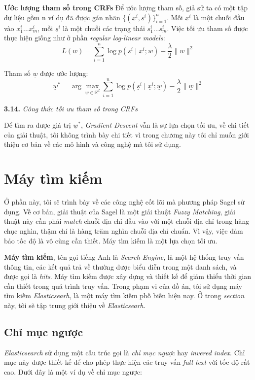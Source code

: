 \vspace{0.5cm}
\textbf{Ước lượng tham số trong CRFs} Để ước lượng tham số, giả sử ta có một tập dữ liệu gồm n ví dụ đã được gán nhãn $\{(\underline{x}^i,\underline{s}^i)\}_{i=1}^n$. Mỗi $\underline{x}^i$ là một chuỗi đầu vào $x_1^i ... x_m^i$, mỗi $\underline{s}^i$ là một chuỗi các trạng thái $s_1^i ... s_m^i $. Việc tối ưu tham số được thực hiện giống như ở phần \textit{regular log-linear models}:
$$L(\underline{w}) = \sum_{i=1}^n \log p(\underline{s}^i \mid \underline{x}^i;w) - \frac{\lambda}{2}\|\underline{w}\|^2$$

Tham số $\underline{w}$ được ước lượng:
$$\underline{w}^* = \arg \max_{\underline{w} \in \mathbb{R}^d} \sum_{i=1}^n \log p(\underline{s}^i \mid \underline{x}^i; \underline{w}) - \frac{\lambda}{2}\|\underline{w}\|^2 $$
\begin{center}

\vspace{0.1cm}
\textbf{3.14.} \textit{Công thức tối ưu tham số trong CRFs}    
\end{center}

Để tìm ra được giá trị $\underline{w}^*$, \textit{Gradient Descent} vẫn là sự lựa chọn tối ưu, về chi tiết của giải thuật, tôi không trình bày chi tiết vì trong chương này tôi chỉ muốn giới thiệu cơ bản về các mô hình và công nghệ mà tôi sử dụng.

\section{Máy tìm kiếm}
Ở phần này, tôi sẽ trình bày về các công nghệ cốt lõi mà phương pháp Sagel sử dụng. Về cơ bản, giải thuật của Sagel là một giải thuật \textit{Fuzzy Matching}, giải thuật này cần phải \textit{match} chuỗi địa chỉ đầu vào với một chuỗi địa chỉ trong hàng chục nghìn, thậm chí là hàng trăm nghìn chuỗi địa chỉ chuẩn. Vì vậy, việc đảm bảo tốc độ là vô cùng cần thiết. Máy tìm kiếm là một lựa chọn tối ưu.

\vspace{0.5cm}
\textbf{Máy tìm kiếm}, tên gọi tiếng Anh là \textit{Search Engine}, là một hệ thống truy vấn thông tin, các kết quả trả về thường được biểu diễn trong một danh sách, và được gọi là \textit{hits}. Máy tìm kiếm được xây dựng và thiết kế để giảm thiểu thời gian cần thiết trong quá trình truy vấn. Trong phạm vi của đồ án, tôi sử dụng máy tìm kiếm \textit{Elasticsearh}, là một máy tìm kiếm phố biến hiện nay. Ở trong \textit{section} này, tôi sẽ tập trung giới thiệu về \textit{Elasticsearh}. 
\subsection{Chỉ mục ngược}
\textit{Elasticsearch} sử dụng một cấu trúc gọi là \textit{chỉ mục ngược} hay \textit{invered index}. Chỉ mục này được thiết kế để cho phép thực hiện các truy vấn \textit{full-text} với tốc độ rất cao. Dưới đây là một ví dụ về chỉ mục ngược:
\vspace{0.3cm}

